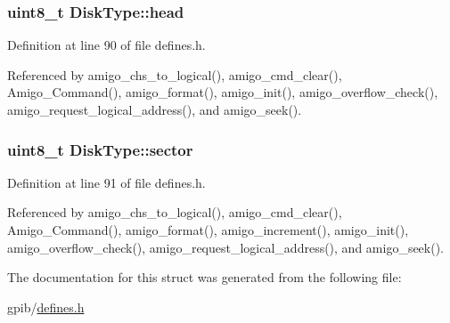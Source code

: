 \subsubsection[{\texorpdfstring{head}{head}}]{\setlength{\rightskip}{0pt plus 5cm}uint8\+\_\+t Disk\+Type\+::head}\hypertarget{structDiskType_ac4cc3cfd8e1fd4d6ec9dded35384786f}{}\label{structDiskType_ac4cc3cfd8e1fd4d6ec9dded35384786f}


Definition at line 90 of file defines.\+h.



Referenced by amigo\+\_\+chs\+\_\+to\+\_\+logical(), amigo\+\_\+cmd\+\_\+clear(), Amigo\+\_\+\+Command(), amigo\+\_\+format(), amigo\+\_\+init(), amigo\+\_\+overflow\+\_\+check(), amigo\+\_\+request\+\_\+logical\+\_\+address(), and amigo\+\_\+seek().

\subsubsection[{\texorpdfstring{sector}{sector}}]{\setlength{\rightskip}{0pt plus 5cm}uint8\+\_\+t Disk\+Type\+::sector}\hypertarget{structDiskType_a6f0a12d4184ccb30a7a5e6e6e713ca85}{}\label{structDiskType_a6f0a12d4184ccb30a7a5e6e6e713ca85}


Definition at line 91 of file defines.\+h.



Referenced by amigo\+\_\+chs\+\_\+to\+\_\+logical(), amigo\+\_\+cmd\+\_\+clear(), Amigo\+\_\+\+Command(), amigo\+\_\+format(), amigo\+\_\+increment(), amigo\+\_\+init(), amigo\+\_\+overflow\+\_\+check(), amigo\+\_\+request\+\_\+logical\+\_\+address(), and amigo\+\_\+seek().



The documentation for this struct was generated from the following file\+:\begin{DoxyCompactItemize}
\item 
gpib/\hyperlink{defines_8h}{defines.\+h}\end{DoxyCompactItemize}

